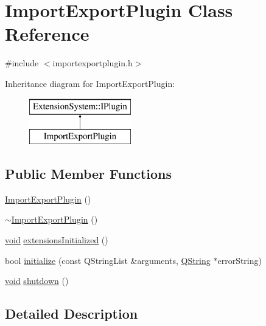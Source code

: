 \hypertarget{class_import_export_plugin}{\section{\-Import\-Export\-Plugin \-Class \-Reference}
\label{class_import_export_plugin}
}


{\ttfamily \#include $<$importexportplugin.\-h$>$}

\-Inheritance diagram for \-Import\-Export\-Plugin\-:\begin{figure}[H]
\begin{center}
\leavevmode
\includegraphics[height=2.000000cm]{class_import_export_plugin}
\end{center}
\end{figure}
\subsection*{\-Public \-Member \-Functions}
\begin{DoxyCompactItemize}
\item 
\hyperlink{group__importexportplugin_ga925c9f27737044548e1b28010361c41b}{\-Import\-Export\-Plugin} ()
\item 
\hyperlink{group__importexportplugin_gaf5eae178665a2798a8172dd3a45ff9af}{$\sim$\-Import\-Export\-Plugin} ()
\item 
\hyperlink{group___u_a_v_objects_plugin_ga444cf2ff3f0ecbe028adce838d373f5c}{void} \hyperlink{group__importexportplugin_ga3ed58e4917d076228fd3020bbcb58dfa}{extensions\-Initialized} ()
\item 
bool \hyperlink{group__importexportplugin_ga933c5c69e64d5980240a5a301043eb52}{initialize} (const \-Q\-String\-List \&arguments, \hyperlink{group___u_a_v_objects_plugin_gab9d252f49c333c94a72f97ce3105a32d}{\-Q\-String} $\ast$error\-String)
\item 
\hyperlink{group___u_a_v_objects_plugin_ga444cf2ff3f0ecbe028adce838d373f5c}{void} \hyperlink{group__importexportplugin_ga140c1b62a5f39af6adb314e220eeb996}{shutdown} ()
\end{DoxyCompactItemize}


\subsection{\-Detailed \-Description}


